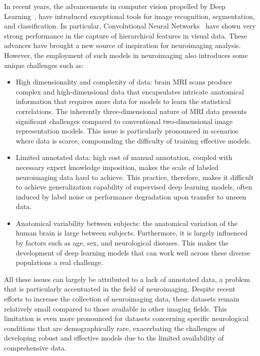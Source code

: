 In recent years, the advancements in computer vision propelled by Deep
Learning~, have introduced exceptional tools for image
recognition, segmentation, and classification. In particular, Convolutional
Neural Networks~ have shown very strong performance in
the capture of hierarchical features in visual data. These advances have brought
a new source of inspiration for neuroimaging analysis. However, the employment
of such models in neuroimaging also introduces some unique challenges such as:
\begin{itemize}
    \item High dimensionality and complexity of data: brain MRI scans produce
    complex and high-dimensional data that encapsulates intricate anatomical
    information that requires more data for models to learn the statistical correlations. The inherently three-dimensional nature of MRI data presents
    significant challenges compared to conventional two-dimensional image
    representation models. This
    issue is particularly pronounced in scenarios where data is scarce,
    compounding the difficulty of training effective models.
    \item Limited annotated data: high cost of manual annotation, coupled with
    necessary expert knowledge imposition, makes the scale of labeled
    neuroimaging data hard to achieve. This practice, therefore, makes it
    difficult to achieve generalization capability of supervised deep learning
    models, often induced by label noise or performance degradation upon
    transfer to unseen data.
    \item Anatomical variability between subjects: the anatomical variation of
    the human brain is large between subjects. Furthermore, it is largely
    influenced by factors such as age, sex, and neurological diseases. This
    makes the development of deep learning models that can work well across
    these diverse populations a real challenge.
\end{itemize}

All these issues can largely be attributed to a lack of annotated data, a
problem that is particularly accentuated in the field of neuroimaging. Despite
recent efforts to increase the collection of neuroimaging data, these datasets
remain relatively small compared to those available in other imaging fields.
This limitation is even more pronounced for datasets concerning specific
neurological conditions that are demographically rare, exacerbating the
challenges of developing robust and effective models due to the limited
availability of comprehensive data.

